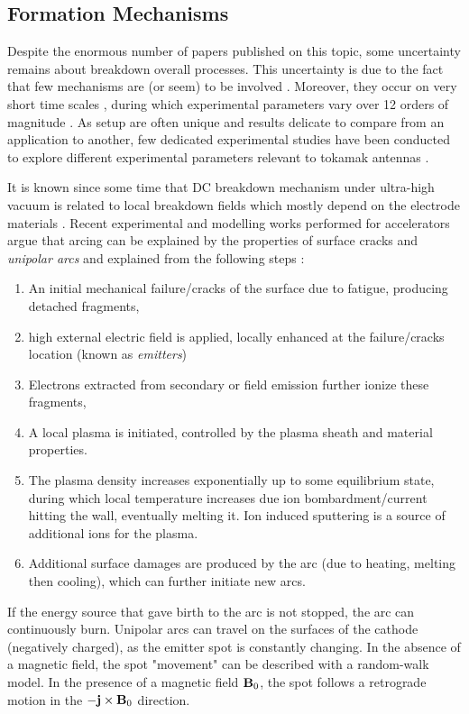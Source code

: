 \subsection{Formation Mechanisms}

Despite the enormous number of papers published on this topic, some uncertainty remains about breakdown overall processes. This uncertainty is due to the fact that few mechanisms are (or seem) to be involved . Moreover, they occur on very short time scales , during which experimental parameters vary over 12 orders of magnitude . As setup are often unique and results delicate to compare from an application to another, few dedicated experimental studies have been conducted to explore different  experimental parameters relevant to tokamak antennas .

It is known since some time that DC breakdown mechanism under ultra-high vacuum is related to local breakdown fields which mostly depend on the electrode materials . Recent experimental and modelling works performed for accelerators argue that arcing can be explained by the properties of surface cracks and \textit{unipolar arcs} and explained from the following steps :
\begin{enumerate}
\item An initial mechanical failure/cracks of the surface due to fatigue, producing detached fragments,
\item high external electric field is applied, locally enhanced at the failure/cracks location (known as \textit{emitters})
\item Electrons extracted from secondary or field emission further ionize these fragments,
\item A local plasma is initiated, controlled by the plasma sheath and material properties. 
\item The plasma density increases exponentially up to some equilibrium state, during which local temperature increases due ion bombardment/current hitting the wall, eventually melting it. Ion induced sputtering is a source of additional ions for the plasma.
\item Additional surface damages are produced by the arc (due to heating, melting then cooling), which can further initiate new arcs.
\end{enumerate}
If the energy source that gave birth to the arc is not stopped, the arc can continuously burn. Unipolar arcs can travel on the surfaces of the cathode (negatively charged), as the emitter spot is constantly changing. In the absence of a magnetic field, the spot "movement" can be described with a random-walk model. In the presence of a magnetic field ${\mathbf B}_0$, the spot follows a retrograde motion in the $-{\mathbf j}\times{\mathbf B}_0$ direction. 

